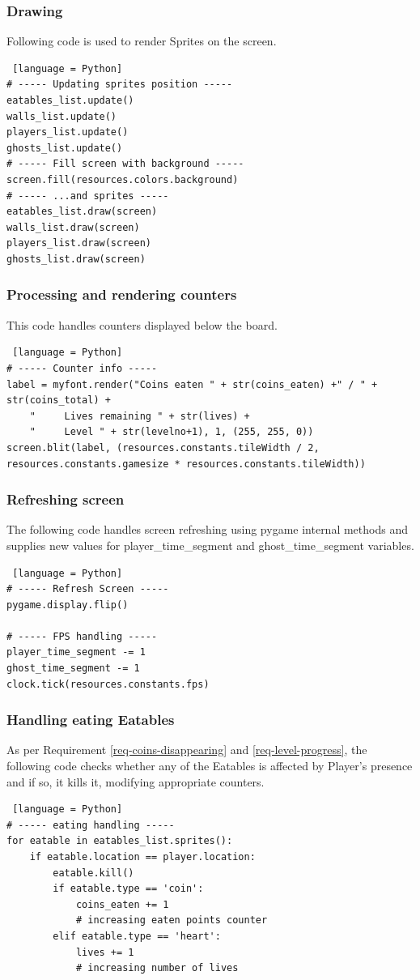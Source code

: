 \documentclass[11pt,a4paper,notitlepage]{report}
\begin{document}
				\subsubsection{Drawing}
					Following code is used to render Sprites on the screen.
					\begin{lstlisting} [language = Python]
# ----- Updating sprites position -----
eatables_list.update()
walls_list.update()
players_list.update()
ghosts_list.update()
# ----- Fill screen with background -----
screen.fill(resources.colors.background)
# ----- ...and sprites -----
eatables_list.draw(screen)
walls_list.draw(screen)
players_list.draw(screen)
ghosts_list.draw(screen)
					\end{lstlisting}
				\subsubsection{Processing and rendering counters}
					This code handles counters displayed below the board.
					\begin{lstlisting} [language = Python]	
# ----- Counter info -----
label = myfont.render("Coins eaten " + str(coins_eaten) +" / " + str(coins_total) +
	"     Lives remaining " + str(lives) +
	"     Level " + str(levelno+1), 1, (255, 255, 0))
screen.blit(label, (resources.constants.tileWidth / 2, resources.constants.gamesize * resources.constants.tileWidth))
					\end{lstlisting}
				\subsubsection{Refreshing screen}
					The following code handles screen refreshing using pygame internal methods and supplies new values for player\_time\_segment and ghost\_time\_segment variables.
					\begin{lstlisting} [language = Python]
# ----- Refresh Screen -----
pygame.display.flip()

# ----- FPS handling -----
player_time_segment -= 1
ghost_time_segment -= 1
clock.tick(resources.constants.fps)
					\end{lstlisting}
				\subsubsection{Handling eating Eatables}
					As per Requirement \ref{req-coins-disappearing} and \ref{req-level-progress}, the following code checks whether any of the Eatables is affected by Player's presence and if so, it kills it, modifying appropriate counters.
					\begin{lstlisting} [language = Python]
# ----- eating handling -----
for eatable in eatables_list.sprites():
	if eatable.location == player.location:
		eatable.kill()
		if eatable.type == 'coin':
			coins_eaten += 1
			# increasing eaten points counter
		elif eatable.type == 'heart':
			lives += 1
			# increasing number of lives
					\end{lstlisting}
\end{document}
